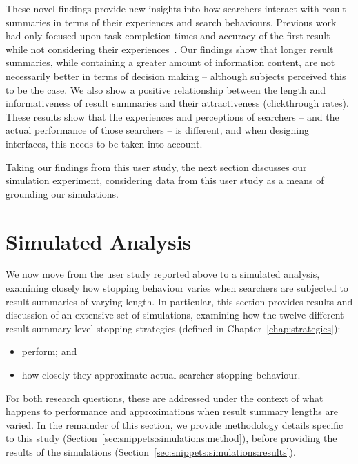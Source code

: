 These novel findings provide new insights into how searchers interact with result summaries in terms of their experiences and search behaviours. Previous work had only focused upon task completion times and accuracy of the first result while not considering their experiences~\citep{cutrell2007eye_tracking, kaisser2008improving}. Our findings show that longer result summaries, while containing a greater amount of information content, are not necessarily better in terms of decision making -- although subjects perceived this to be the case. We also show a positive relationship between the length and informativeness of result summaries and their attractiveness (clickthrough rates). These results show that the experiences and perceptions of searchers -- and the actual performance of those searchers -- is different, and when designing interfaces, this needs to be taken into account.

Taking our findings from this user study, the next section discusses our simulation experiment, considering data from this user study as a means of grounding our simulations.

\section{Simulated Analysis}\label{sec:snippets:simulations}
We now move from the user study reported above to a simulated analysis, examining closely how stopping behaviour varies when searchers are subjected to result summaries of varying length. In particular, this section provides results and discussion of an extensive set of simulations, examining how the twelve different result summary level stopping strategies (defined in Chapter~\ref{chap:strategies}):

\begin{itemize}
    \item{ perform; and}
    \item{ how closely they approximate actual searcher stopping behaviour.}
\end{itemize}

For both research questions, these are addressed under the context of what happens to performance and approximations when result summary lengths are varied. In the remainder of this section, we provide methodology details specific to this study (Section~\ref{sec:snippets:simulations:method}), before providing the results of the simulations (Section~\ref{sec:snippets:simulations:results}).

